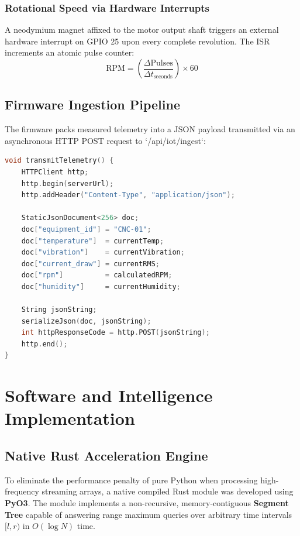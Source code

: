 \documentclass[12pt,a4paper,oneside]{report}
\begin{document}
\subsection{Rotational Speed via Hardware Interrupts}
A neodymium magnet affixed to the motor output shaft triggers an external hardware interrupt on GPIO 25 upon every complete revolution. The ISR increments an atomic pulse counter:
\begin{equation}
    \text{RPM} = \left(\frac{\Delta \text{Pulses}}{\Delta t_{\text{seconds}}}\right) \times 60
\end{equation}

\section{Firmware Ingestion Pipeline}
The firmware packs measured telemetry into a JSON payload transmitted via an asynchronous HTTP POST request to `/api/iot/ingest`:
\begin{lstlisting}[language=C, caption={ESP32 HTTP Telemetry Ingestion Routine}]
void transmitTelemetry() {
    HTTPClient http;
    http.begin(serverUrl);
    http.addHeader("Content-Type", "application/json");

    StaticJsonDocument<256> doc;
    doc["equipment_id"] = "CNC-01";
    doc["temperature"]  = currentTemp;
    doc["vibration"]    = currentVibration;
    doc["current_draw"] = currentRMS;
    doc["rpm"]          = calculatedRPM;
    doc["humidity"]     = currentHumidity;

    String jsonString;
    serializeJson(doc, jsonString);
    int httpResponseCode = http.POST(jsonString);
    http.end();
}
\end{lstlisting}

\newpage
\chapter{Software and Intelligence Implementation}

\section{Native Rust Acceleration Engine}
To eliminate the performance penalty of pure Python when processing high-frequency streaming arrays, a native compiled Rust module was developed using \textbf{PyO3}. The module implements a non-recursive, memory-contiguous \textbf{Segment Tree} capable of answering range maximum queries over arbitrary time intervals $[l, r)$ in $O(\log N)$ time.
\end{document}
